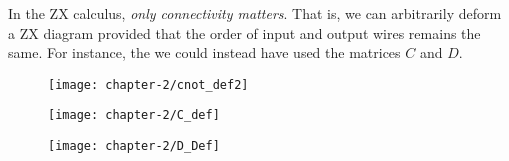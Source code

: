 \begin{figure}[H]
    \centering
\end{figure}

In the ZX calculus, \textit{only connectivity matters}. That is, we can arbitrarily deform a ZX diagram provided that the order of input and output wires remains the same. For instance, the we could instead have used the matrices $C$ and $D$.

\begin{figure}[H]
    \centering
    \texttt{[image: chapter-2/cnot\_def2]}
\end{figure}

\begin{figure}[H]
\centering
\begin{minipage}{.4\textwidth}
    \centering
    \texttt{[image: chapter-2/C\_def]}
\end{minipage}%
\begin{minipage}{.4\textwidth}
    \centering
    \texttt{[image: chapter-2/D\_Def]}
\end{minipage}
\end{figure}

